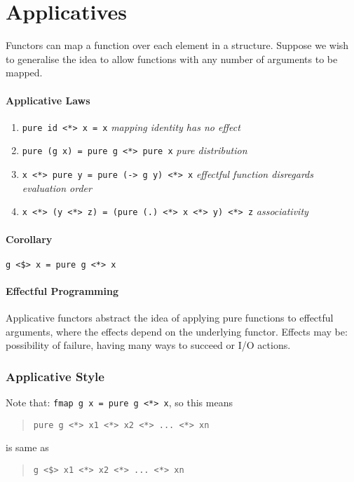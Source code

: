 \documentclass{article}
\begin{document}
\section{Applicatives}
Functors can map a function over each element in a structure. Suppose we wish to generalise the idea to allow functions with \textcolor{Mulberry}{any number of arguments} to be mapped. 

\paragraph{Applicative Laws}
\begin{enumerate}
  \item \texttt{pure id <*> x = x} \textcolor{Mulberry}{\emph{mapping identity has no effect}}
  \item \texttt{pure (g x) = pure g <*> pure x} \textcolor{Mulberry}{\emph{pure distribution}}
  \item \texttt{x <*> pure y = pure (\g -> g y) <*> x} \textcolor{Mulberry}{\emph{effectful function disregards evaluation order}}
  \item \texttt{x <*> (y <*> z) = (pure (.) <*> x <*> y) <*> z} \textcolor{Mulberry}{\emph{associativity}}
\end{enumerate}

\paragraph{Corollary}
\verb|g <$> x = pure g <*> x|

\paragraph{Effectful Programming}
Applicative functors abstract the idea of applying \textcolor{Mulberry}{pure functions} to \textcolor{Mulberry}{effectful arguments}, where the effects depend on the underlying functor. Effects may be: possibility of failure, having many ways to succeed or I/O actions. \newline 
 
\subsubsection*{Applicative Style}
Note that: \textcolor{Emerald}{\texttt{fmap g x = pure g <*> x}}, so this means 
\begin{quote}
\textcolor{Emerald}{\texttt{pure g <*> x1 <*> x2 <*> ... <*> xn}}\par 
\end{quote}
is same as
\begin{quote}
\newline\textcolor{Emerald}{\texttt{g <\$> x1 <*> x2 <*> ... <*> xn}}
\end{quote}
\end{document}
